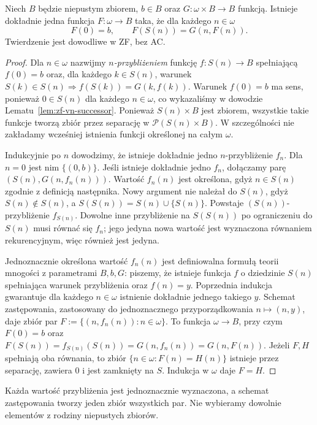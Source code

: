\begin{twierdzenie}
\label{thm:zf-omega-recursion}
Niech $B$ będzie niepustym zbiorem,
$b\in B$ oraz $G:\omega\times B\to B$ funkcją.
Istnieje dokładnie jedna funkcja $F:\omega\to B$
taka, że dla każdego $n\in\omega$
\[
F(0)=b,\qquad F(S(n))=G(n,F(n)).
\]
Twierdzenie jest dowodliwe w ZF, bez AC.
\end{twierdzenie}
\begin{proof}
Dla $n\in\omega$ nazwijmy \emph{$n$-przybliżeniem}
funkcję $f:S(n)\to B$ spełniającą $f(0)=b$
oraz, dla każdego $k\in S(n)$, warunek
$S(k)\in S(n)\Longrightarrow
f(S(k))=G(k,f(k))$.
Warunek $f(0)=b$ ma sens, ponieważ
$0\in S(n)$ dla każdego $n\in\omega$,
co wykazaliśmy w dowodzie
Lematu~\ref{lem:zf-vn-successor}.
Ponieważ $S(n)\times B$ jest zbiorem,
wszystkie takie funkcje tworzą zbiór
przez separację w $\mathcal P(S(n)\times B)$.
W szczególności nie zakładamy wcześniej
istnienia funkcji określonej na całym $\omega$.

Indukcyjnie po $n$ dowodzimy, że istnieje dokładnie
jedno $n$-przybliżenie $f_n$.
Dla $n=0$ jest nim $\{(0,b)\}$.
Jeśli istnieje dokładnie jedno $f_n$, dołączamy
parę $(S(n),G(n,f_n(n)))$.
Wartość $f_n(n)$ jest określona,
gdyż $n\in S(n)$ zgodnie z definicją następnika.
Nowy argument nie należał do $S(n)$,
gdyż $S(n)\notin S(n)$,
a $S(S(n))=S(n)\cup\{S(n)\}$.
Powstaje $(S(n))$-przybliżenie $f_{S(n)}$.
Dowolne inne przybliżenie na $S(S(n))$
po ograniczeniu do $S(n)$ musi równać się $f_n$;
jego jedyna nowa wartość jest wyznaczona równaniem
rekurencyjnym, więc również jest jedyna.

Jednoznacznie określona wartość $f_n(n)$
jest definiowalna formułą teorii mnogości
z parametrami $B,b,G$: piszemy, że istnieje
funkcja $f$ o dziedzinie $S(n)$ spełniająca
warunek przybliżenia oraz $f(n)=y$.
Poprzednia indukcja gwarantuje dla każdego
$n\in\omega$ istnienie dokładnie jednego takiego $y$.
Schemat zastępowania, zastosowany do jednoznacznego
przyporządkowania $n\mapsto (n,y)$,
daje zbiór par
$F:=\{(n,f_n(n)):n\in\omega\}$.
To funkcja $\omega\to B$, przy czym
$F(0)=b$ oraz
$F(S(n))=f_{S(n)}(S(n))=G(n,f_n(n))=G(n,F(n))$.
Jeżeli $F,H$ spełniają oba równania,
to zbiór $\{n\in\omega:F(n)=H(n)\}$
istnieje przez separację, zawiera $0$
i jest zamknięty na $S$. Indukcja w $\omega$
daje $F=H$.
\end{proof}

\begin{uwaga}
\label{rem:zf-recursion-not-choice}
Każda wartość przybliżenia jest jednoznacznie
wyznaczona, a schemat zastępowania tworzy
jeden zbiór wszystkich par. Nie wybieramy
dowolnie elementów z rodziny niepustych zbiorów.
\end{uwaga}

